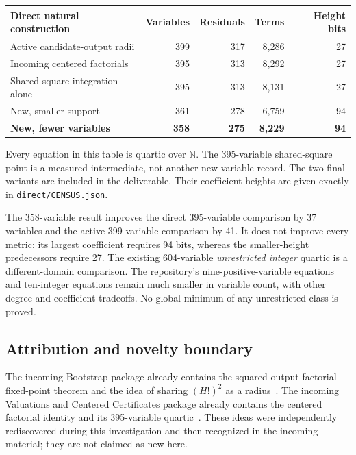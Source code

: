 \documentclass[11pt]{article}
\theoremstyle{definition}\newtheorem{definition}[theorem]{Definition}
\newcommand{\N}{\mathbb N}\newcommand{\Z}{\mathbb Z}\newcommand{\Q}{\mathbb Q}
\newcommand{\file}[1]{\nolinkurl{#1}}
\begin{document}
\begin{center}\small
\begin{tabular}{lrrrr}
\toprule
Direct natural construction & Variables & Residuals & Terms & Height bits\\
\midrule
Active candidate-output radii & 399 & 317 & 8,286 & 27\\
Incoming centered factorials & 395 & 313 & 8,292 & 27\\
Shared-square integration alone & 395 & 313 & 8,131 & 27\\
New, smaller support & 361 & 278 & 6,759 & 94\\
\textbf{New, fewer variables} & \textbf{358} & \textbf{275} & \textbf{8,229} & \textbf{94}\\
\bottomrule
\end{tabular}
\end{center}
Every equation in this table is quartic over $\N$. The 395-variable
shared-square point is a measured intermediate, not another new variable
record. The two final variants are included in the deliverable. Their
coefficient heights are given exactly in \file{direct/CENSUS.json}.

The 358-variable result improves the direct 395-variable comparison by
37 variables and the active 399-variable comparison by 41. It does not
improve every metric: its largest coefficient requires 94 bits, whereas
the smaller-height predecessors require 27. The existing 604-variable
\emph{unrestricted integer} quartic is a different-domain comparison.
The repository's nine-positive-variable equations and ten-integer
equations remain much smaller in variable count, with other degree and
coefficient tradeoffs. No global minimum of any unrestricted class is proved.

\subsection{Attribution and novelty boundary}
The incoming Bootstrap package already contains the squared-output
factorial fixed-point theorem and the idea of sharing $(H!)^2$ as a
radius~\cite{bootstrap}. The incoming Valuations and Centered Certificates
package already contains the centered factorial identity and its
395-variable quartic~\cite{centered}. These ideas were independently
rediscovered during this investigation and then recognized in the
incoming material; they are not claimed as new here.
\end{document}
